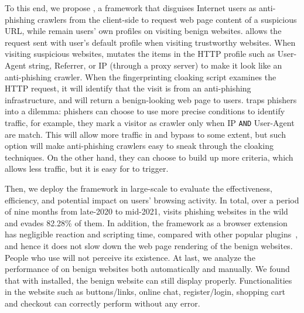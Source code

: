 To this end, we propose \spartacus, a framework that disguises Internet users as anti-phishing crawlers from the client-side to request web page content of a suspicious URL, while remain users' own profiles on visiting benign websites.
\spartacus allows the request sent with user's default profile when visiting trustworthy websites.
When visiting suspicious websites, \spartacus mutates the items in the HTTP profile such as User-Agent string, Referrer, or IP (through a proxy server) to make it look like an anti-phishing crawler.
When the fingerprinting cloaking script examines the HTTP request, it will identify that the visit is from an anti-phishing infrastructure, and will return a benign-looking web page to users.
\spartacus traps phishers into a dilemma: phishers can choose to use more precise conditions to identify traffic, for example, they mark a visitor as crawler only when IP \texttt{AND} User-Agent are match.
This will allow more traffic in and bypass \spartacus to some extent,
but such option will make anti-phishing crawlers easy to sneak through the cloaking techniques.
On the other hand, they can choose to build up more criteria, which allows less traffic, but it is easy for \spartacus to trigger.


Then, we deploy the \spartacus framework in large-scale to evaluate the effectiveness, efficiency, and potential impact on users' browsing activity.
In total, over a period of nine months from late-2020 to mid-2021, \spartacus visits \totalphishing phishing websites in the wild and evades 82.28\% of them.
In addition, the \spartacus framework as a browser extension has negligible reaction and scripting time, compared with other popular plugins~\cite{exthouse}, and hence it does not slow down the web page rendering of the benign websites.
People who use \spartacus will not perceive its existence.
At last, we analyze the performance of \spartacus on benign websites both automatically and manually.
We found that with \spartacus installed, the benign website can still display properly.
Functionalities in the website such as buttons/links, online chat, register/login, shopping cart and checkout can correctly perform without any error.

